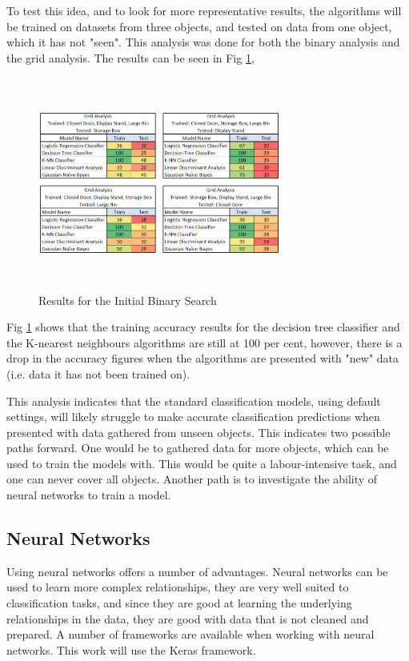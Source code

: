 \documentclass[conference]{IEEEtran}
\begin{document}
To test this idea, and to look for more representative results, the algorithms will be trained on datasets from three objects, and tested on data from one object, which it has not "seen". This analysis was done for both the binary analysis and the grid analysis. The results can be seen in Fig \ref{fig:new_data_results},

\begin{figure}[ht]
\includegraphics[width=8cm, height=7cm]{images/new_data_results.png}
\centering
\caption{Results for the Initial Binary Search}
\label{fig:new_data_results}
\end{figure}

Fig \ref{fig:new_data_results} shows that the training accuracy results for the decision tree classifier and the K-nearest neighbours algorithms are still at 100 per cent, however, there is a drop in the accuracy figures when the algorithms are presented with "new" data (i.e. data it has not been trained on).

This analysis indicates that the standard classification models, using default settings, will likely struggle to make accurate classification predictions when presented with data gathered from unseen objects. This indicates two possible paths forward. One would be to gathered data for more objects, which can be used to train the models with. This would be quite a labour-intensive task, and one can never cover all objects. Another path is to investigate the ability of neural networks to train a model. 

\subsection{Neural Networks}
Using neural networks offers a number of advantages. Neural networks can be used to learn more complex relationships, they are very well suited to classification tasks, and since they are good at learning the underlying relationships in the data, they are good with data that is not cleaned and prepared. A number of frameworks are available when working with neural networks. This work will use the Keras framework.
\end{document}
